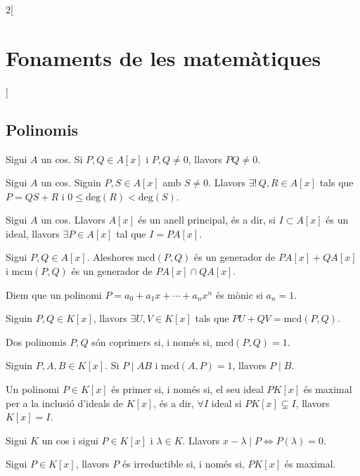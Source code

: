 \documentclass[class=article,10pt,crop=false]{standalone}
\begin{document}
\begin{multicols}{2}[\section{Fonaments de les matemàtiques}]
\subsection{Polinomis}
\begin{prop}
Sigui $A$ un cos. Si $P,Q\in A[x]$ i $P,Q\ne0$, llavors $PQ\ne 0$.
\end{prop}
\begin{theorem}
Sigui $A$ un cos. Siguin $P,S\in A[x]$ amb $S\ne 0$. Llavors $\exists!\, Q,R\in A[x]$ tals que $P=QS+R$ i $0\leq\text{deg}(R)<\text{deg}(S)$.
\end{theorem}
\begin{theorem}
Sigui $A$ un cos. Llavors $A[x]$ és un anell principal, és a dir, si $I\subset A[x]$ és un ideal, llavors $\exists P\in A[x]$ tal que $I=PA[x]$.
\end{theorem}
\begin{definition}
Sigui $P,Q\in A[x]$. Aleshores $\text{mcd}(P,Q)$ és un generador de $PA[x]+QA[x]$ i $\text{mcm}(P,Q)$ és un generador de $PA[x]\cap QA[x]$.
\end{definition}
\begin{definition}
Diem que un polinomi $P=a_0+a_1x+\cdots+a_nx^n$ és mònic si $a_n=1$.
\end{definition}
\begin{theorem}
Siguin $P,Q\in K[x]$, llavors $\exists U,V\in K[x]$ tals que $PU+QV=\text{mcd}(P,Q)$.
\end{theorem}
\begin{definition}
Dos polinomis $P,Q$ són coprimers si, i només si, $\text{mcd}(P,Q)=1$.
\end{definition}
\begin{theorem}
Siguin $P,A,B\in K[x]$. Si $P\mid AB$ i $\text{mcd}(A,P)=1$, llavors $P\mid B$.
\end{theorem}
\begin{definition}
Un polinomi $P\in K[x]$ és primer si, i només si, el seu ideal $PK[x]$ és maximal per a la inclusió d'ideals de $K[x]$, és a dir, $\forall I$ ideal si $PK[x] \varsubsetneq I$, llavors $K[x]=I$.
\end{definition}
\begin{theorem}
Sigui $K$ un cos i sigui $P\in K[x]$ i $\lambda\in K$. Llavors $x-\lambda\mid P\iff P(\lambda)=0$.
\end{theorem}
\begin{definition}
Sigui $P\in K[x]$, llavors $P$ és irreductible si, i només si, $PK[x]$ és maximal.

\end{definition}
\end{multicols}
\end{document}

